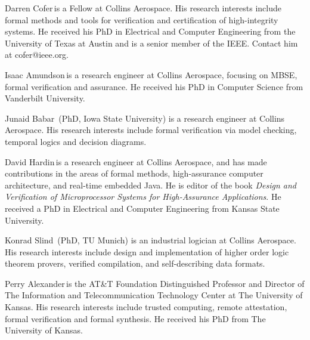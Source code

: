 \begin{IEEEbiography}{Darren Cofer}{\,}is a Fellow at Collins Aerospace. His research interests include formal methods and tools for verification and certification of high-integrity systems. He received his PhD in Electrical and Computer Engineering from the University of Texas at Austin and is a senior member of the IEEE. Contact him at cofer@ieee.org.
\end{IEEEbiography}

\begin{IEEEbiography}{Isaac Amundson}{\,}is a research engineer at Collins Aerospace, focusing on MBSE, formal verification and assurance.  He received his PhD in Computer Science from Vanderbilt University.
\end{IEEEbiography}

\begin{IEEEbiography}{Junaid Babar}{\,} (PhD, Iowa State University) is a research engineer at Collins Aerospace.
His research interests include formal verification via model checking, temporal logics and decision diagrams.
\end{IEEEbiography}

\begin{IEEEbiography}{David Hardin}{\,}is a research engineer
  at Collins Aerospace, and has made contributions in
  the areas of formal methods, high-assurance computer architecture,
  and real-time embedded Java.  He is editor of the book \emph{Design
    and Verification of Microprocessor Systems for High-Assurance
    Applications}.  He received a PhD in Electrical and Computer
  Engineering from Kansas State University.
\end{IEEEbiography}

\begin{IEEEbiography}{Konrad Slind}{\,} (PhD, TU Munich) is an industrial logician at Collins Aerospace.
  His research interests include design and implementation of higher
  order logic theorem provers, verified compilation, and
  self-describing data formats.
\end{IEEEbiography}

\begin{IEEEbiography}{Perry Alexander}{\,}is the AT\&T Foundation
  Distinguished Professor and Director of The Information and
  Telecommunication Technology Center at The University of Kansas.
  His research interests include trusted computing, remote
  attestation, formal verification and formal synthesis. He received
  his PhD from The University of Kansas.
\end{IEEEbiography}

